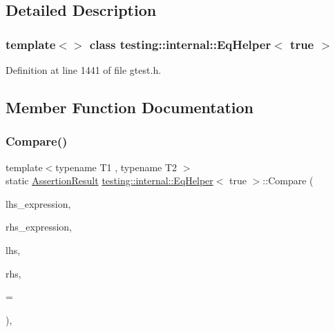 \subsection{Detailed Description}
\subsubsection*{template$<$$>$\newline
class testing\+::internal\+::\+Eq\+Helper$<$ true $>$}



Definition at line 1441 of file gtest.\+h.



\subsection{Member Function Documentation}
\mbox{\label{classtesting_1_1internal_1_1EqHelper_3_01true_01_4_a12c7194b2a210b61f06c912eef484ca6}} 
\subsubsection{\texorpdfstring{Compare()}{Compare()}\hspace{0.1cm}{\footnotesize\ttfamily [1/2]}}
{\footnotesize\ttfamily template$<$typename T1 , typename T2 $>$ \\
static \hyperlink{classtesting_1_1AssertionResult}{Assertion\+Result} \hyperlink{classtesting_1_1internal_1_1EqHelper}{testing\+::internal\+::\+Eq\+Helper}$<$ true $>$\+::Compare (\begin{DoxyParamCaption}\item[{const char $\ast$}]{lhs\+\_\+expression,  }\item[{const char $\ast$}]{rhs\+\_\+expression,  }\item[{const T1 \&}]{lhs,  }\item[{const T2 \&}]{rhs,  }\item[{typename \hyperlink{structtesting_1_1internal_1_1EnableIf}{Enable\+If}$<$!\hyperlink{structtesting_1_1internal_1_1is__pointer}{is\+\_\+pointer}$<$ T2 $>$\+::value $>$\+::type $\ast$}]{ = {} }\end{DoxyParamCaption})\hspace{0.3cm}{\ttfamily [inline]}, {\ttfamily [static]}}



